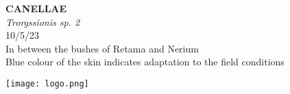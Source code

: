 \documentclass[
  landscape]{article}
\begin{document}
\begin{mdframed}[linecolor=mycolortext, linewidth=2pt, backgroundcolor=mycolor]

  \bigskip
  \begin{flushright}
  \begin{minipage}[t][-50ex][t]{16em}  
  \end{minipage}
  \end{flushright}
  \bigskip
  \begin{adjustwidth}{1cm}{1cm}
  {\fontsize{50pt}{0pt}\selectfont\bf\textcolor{mycolortext}{ CANELLAE }} \\
  \linebreak
  \linebreak
  {\fontsize{40pt}{100pt}\selectfont\textcolor{mycolortext}{\emph{ Trorgssionis sp. 2 }}} \\
  \vfill
  {\fontsize{30pt}{100pt}\selectfont\textcolor{mycolortext}{ 10/5/23 }} \\
  \vfill
  {\fontsize{30pt}{100pt}\selectfont\textcolor{mycolortext}{ In between the bushes of Retama and Nerium }} \\
  \vfill
  {\fontsize{30pt}{50pt}\selectfont\textcolor{mycolortext}{ Blue colour of the skin indicates adaptation to the field conditions }} \\
  \end{adjustwidth}
  \begin{center}
  \texttt{[image: logo.png]}
  \end{center}
  \end{mdframed}
  \pagebreak

\end{document}

